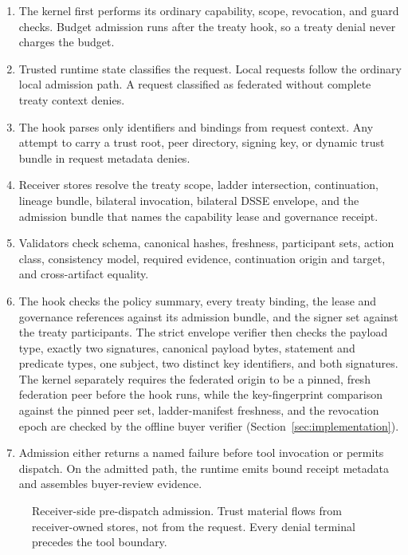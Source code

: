 \begin{enumerate}[noitemsep,topsep=2pt,leftmargin=1.4em]
  \item The kernel first performs its ordinary capability, scope, revocation, and guard checks. Budget admission runs after the treaty hook, so a treaty denial never charges the budget.
  \item Trusted runtime state classifies the request. Local requests follow
  the ordinary local admission path. A request classified as federated without
  complete treaty context denies.
  \item The hook parses only identifiers and bindings from request context. Any attempt to carry a trust root, peer directory, signing key, or dynamic trust bundle in request metadata denies.
  \item Receiver stores resolve the treaty scope, ladder intersection, continuation, lineage bundle, bilateral invocation, bilateral DSSE envelope, and the admission bundle that names the capability lease and governance receipt.
  \item Validators check schema, canonical hashes, freshness, participant sets, action class, consistency model, required evidence, continuation origin and target, and cross-artifact equality.
  \item The hook checks the policy summary, every treaty binding, the lease and governance references against its admission bundle, and the signer set against the treaty participants. The strict envelope verifier then checks the payload type, exactly two signatures, canonical payload bytes, statement and predicate types, one subject, two distinct key identifiers, and both signatures. The kernel separately requires the federated origin to be a pinned, fresh federation peer before the hook runs, while the key-fingerprint comparison against the pinned peer set, ladder-manifest freshness, and the revocation epoch are checked by the offline buyer verifier (Section~\ref{sec:implementation}).
  \item Admission either returns a named failure before tool invocation or permits dispatch. On the admitted path, the runtime emits bound receipt metadata and assembles buyer-review evidence.
\end{enumerate}

\begin{figure}[!t]
  \centering
  \resizebox{\columnwidth}{!}{}
  \caption{Receiver-side pre-dispatch admission. Trust material flows from receiver-owned stores, not from the request. Every denial terminal precedes the tool boundary.}
  \label{fig:admission}
\end{figure}

